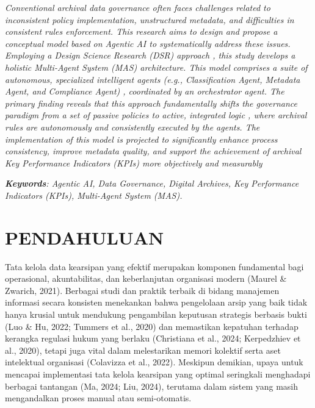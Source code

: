 \emph{Conventional archival data governance often faces challenges
related to inconsistent policy implementation, unstructured metadata,
and difficulties in consistent rules enforcement. This research aims to
design and propose a conceptual model based on Agentic AI to
systematically address these issues. Employing a Design Science Research
(DSR) approach , this study develops a holistic Multi-Agent System (MAS)
architecture. This model comprises a suite of autonomous, specialized
intelligent agents (e.g., Classification Agent, Metadata Agent, and
Compliance Agent) , coordinated by an orchestrator agent. The primary
finding reveals that this approach fundamentally shifts the governance
paradigm from a set of passive policies to active, integrated logic ,
where archival rules are autonomously and consistently executed by the
agents. The implementation of this model is projected to significantly
enhance process consistency, improve metadata quality, and support the
achievement of archival Key Performance Indicators (KPIs) more
objectively and measurably}

\emph{\textbf{Keywords}: Agentic AI, Data Governance, Digital Archives,
Key Performance Indicators (KPIs), Multi-Agent System (MAS).}

\hypertarget{pendahuluan}{%
\section{\texorpdfstring{PENDAHULUAN
}{PENDAHULUAN }}\label{pendahuluan}}

Tata kelola data kearsipan yang efektif merupakan komponen fundamental
bagi operasional, akuntabilitas, dan keberlanjutan organisasi modern
(Maurel \& Zwarich, 2021). Berbagai studi dan praktik terbaik di bidang
manajemen informasi secara konsisten menekankan bahwa pengelolaan arsip
yang baik tidak hanya krusial untuk mendukung pengambilan keputusan
strategis berbasis bukti (Luo \& Hu, 2022; Tummers et al., 2020) dan
memastikan kepatuhan terhadap kerangka regulasi hukum yang berlaku
(Christiana et al., 2024; Kerpedzhiev et al., 2020), tetapi juga vital
dalam melestarikan memori kolektif serta aset intelektual organisasi
(Colavizza et al., 2022). Meskipun demikian, upaya untuk mencapai
implementasi tata kelola kearsipan yang optimal seringkali menghadapi
berbagai tantangan (Ma, 2024; Liu, 2024), terutama dalam sistem yang
masih mengandalkan proses manual atau semi-otomatis.

